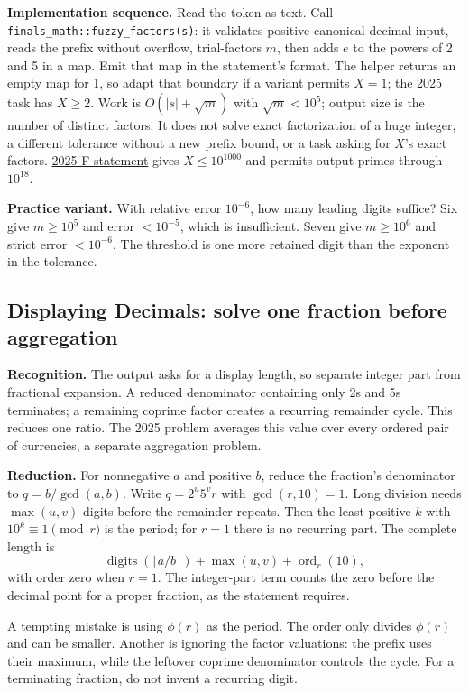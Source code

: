\textbf{Implementation sequence.} Read the token as text. Call \texttt{finals\_math::fuzzy\_factors(s)}: it validates positive canonical decimal input, reads the prefix without overflow, trial-factors $m$, then adds $e$ to the powers of 2 and 5 in a map. Emit that map in the statement's format. The helper returns an empty map for 1, so adapt that boundary if a variant permits $X=1$; the 2025 task has $X\ge2$. Work is $O(|s|+\sqrt m)$ with $\sqrt m<10^5$; output size is the number of distinct factors. It does not solve exact factorization of a huge integer, a different tolerance without a new prefix bound, or a task asking for $X$'s exact factors. \href{https://scorelatam.naquadah.com.br/latam-2025/contest.pdf}{2025 F statement} gives $X\le10^{1000}$ and permits output primes through $10^{18}$.

\textbf{Practice variant.} With relative error $10^{-6}$, how many leading digits suffice? Six give $m\ge10^5$ and error $<10^{-5}$, which is insufficient. Seven give $m\ge10^6$ and strict error $<10^{-6}$. The threshold is one more retained digit than the exponent in the tolerance.

\subsection{Displaying Decimals: solve one fraction before aggregation}\label{case:decimals}

\textbf{Recognition.} The output asks for a display length, so separate integer part from fractional expansion. A reduced denominator containing only 2s and 5s terminates; a remaining coprime factor creates a recurring remainder cycle. This reduces one ratio. The 2025 problem averages this value over every ordered pair of currencies, a separate aggregation problem.

\textbf{Reduction.} For nonnegative $a$ and positive $b$, reduce the fraction's denominator to $q=b/\gcd(a,b)$. Write $q=2^u5^v r$ with $\gcd(r,10)=1$. Long division needs $\max(u,v)$ digits before the remainder repeats. Then the least positive $k$ with $10^k\equiv1\pmod r$ is the period; for $r=1$ there is no recurring part. The complete length is
\[
 \operatorname{digits}(\lfloor a/b\rfloor)+\max(u,v)+\operatorname{ord}_r(10),
\]
with order zero when $r=1$. The integer-part term counts the zero before the decimal point for a proper fraction, as the statement requires.

A tempting mistake is using $\phi(r)$ as the period. The order only divides $\phi(r)$ and can be smaller. Another is ignoring the factor valuations: the prefix uses their maximum, while the leftover coprime denominator controls the cycle. For a terminating fraction, do not invent a recurring digit.

